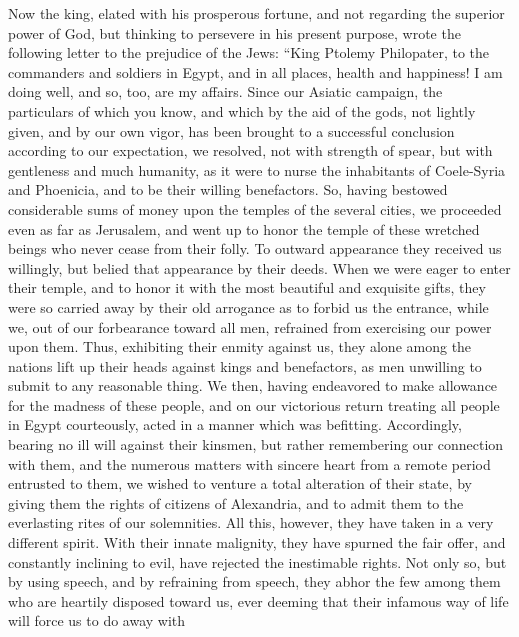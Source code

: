  Now the king, elated with his prosperous fortune, and not
regarding the superior power of God, but thinking to persevere in his
present purpose, wrote the following letter to the prejudice of the
Jews:  ``King Ptolemy Philopater, to the commanders and
soldiers in Egypt, and in all places, health and happiness!
 I am doing well, and so, too, are my affairs.
 Since our Asiatic campaign, the particulars of which you
know, and which by the aid of the gods, not lightly given, and by our
own vigor, has been brought to a successful conclusion according to our
expectation,  we resolved, not with strength of spear, but
with gentleness and much humanity, as it were to nurse the inhabitants
of Coele-Syria and Phoenicia, and to be their willing benefactors.
 So, having bestowed considerable sums of money upon the
temples of the several cities, we proceeded even as far as Jerusalem,
and went up to honor the temple of these wretched beings who never cease
from their folly.  To outward appearance they received us
willingly, but belied that appearance by their deeds. When we were eager
to enter their temple, and to honor it with the most beautiful and
exquisite gifts,  they were so carried away by their old
arrogance as to forbid us the entrance, while we, out of our forbearance
toward all men, refrained from exercising our power upon them.
 Thus, exhibiting their enmity against us, they alone among
the nations lift up their heads against kings and benefactors, as men
unwilling to submit to any reasonable thing.  We then,
having endeavored to make allowance for the madness of these people, and
on our victorious return treating all people in Egypt courteously, acted
in a manner which was befitting.  Accordingly, bearing no
ill will against their kinsmen, but rather remembering our connection
with them, and the numerous matters with sincere heart from a remote
period entrusted to them, we wished to venture a total alteration of
their state, by giving them the rights of citizens of Alexandria, and to
admit them to the everlasting rites of our solemnities. 
All this, however, they have taken in a very different spirit. With
their innate malignity, they have spurned the fair offer, and constantly
inclining to evil,  have rejected the inestimable rights.
Not only so, but by using speech, and by refraining from speech, they
abhor the few among them who are heartily disposed toward us, ever
deeming that their infamous way of life will force us to do away with
